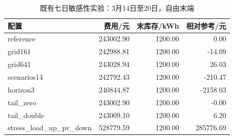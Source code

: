 \begin{table}[htbp]\centering\small
\caption{既有七日敏感性实验：3月14日至20日，自由末端}
\begin{tabular}{lrrr}
\toprule
配置 & 费用/元 & 末库存/kWh & 相对参考/元 \\
\midrule
reference & 243002.90 & 1200.00 & 0.00 \\
grid161 & 242988.81 & 1200.00 & -14.09 \\
grid641 & 243028.94 & 1200.00 & 26.03 \\
scenarios14 & 242792.43 & 1200.00 & -210.47 \\
horizon3 & 240844.87 & 1200.00 & -2158.03 \\
tail\_zero & 243002.90 & 1200.00 & -0.00 \\
tail\_double & 243009.10 & 1200.00 & 6.20 \\
stress\_load\_up\_pv\_down & 528779.59 & 1200.00 & 285776.69 \\
\bottomrule\end{tabular}\end{table}
